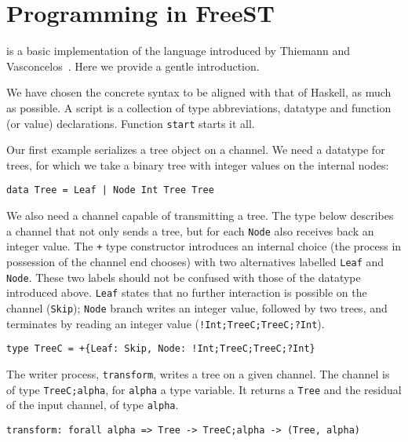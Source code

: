 \section{Programming in FreeST}
\label{sec:programming}

\freest{} is a basic implementation of the language introduced by
Thiemann and Vasconcelos~\cite{DBLP:conf/icfp/ThiemannV16}. Here we
provide a gentle introduction.

We have chosen the concrete syntax to be aligned with that of Haskell,
as much as possible. A \freest{} script is a collection of type
abbreviations, datatype and function (or value) declarations. Function
\lstinline|start| starts it all.

Our first example serializes a tree object on a channel. We need a
datatype for trees, for which we take a binary tree with integer
values on the internal nodes:
%
\begin{lstlisting}
data Tree = Leaf | Node Int Tree Tree
\end{lstlisting}

We also need a channel capable of transmitting a tree. The type below
describes a channel that not only sends a tree, but for each
\lstinline|Node| also receives back an integer value. The
\lstinline|+| type constructor introduces an internal choice (the
process in possession of the channel end chooses) with two
alternatives labelled \lstinline|Leaf| and \lstinline|Node|. These two
labels should not be confused with those of the datatype introduced
above. \lstinline|Leaf| states that no further interaction is possible
on the channel (\lstinline|Skip|); \lstinline|Node| branch writes
an integer value, followed by two trees, and terminates by reading an
integer value (\lstinline|!Int;TreeC;TreeC;?Int|).
%
\begin{lstlisting}
type TreeC = +{Leaf: Skip, Node: !Int;TreeC;TreeC;?Int}
\end{lstlisting}

The writer process, \lstinline|transform|, writes a tree on a given
channel. The channel is of type \lstinline|TreeC;alpha|, for
\lstinline|alpha| a type variable. It returns a \lstinline|Tree| and
the residual of the input channel, of type \lstinline|alpha|.

\begin{lstlisting}
transform: forall alpha => Tree -> TreeC;alpha -> (Tree, alpha)
\end{lstlisting}

